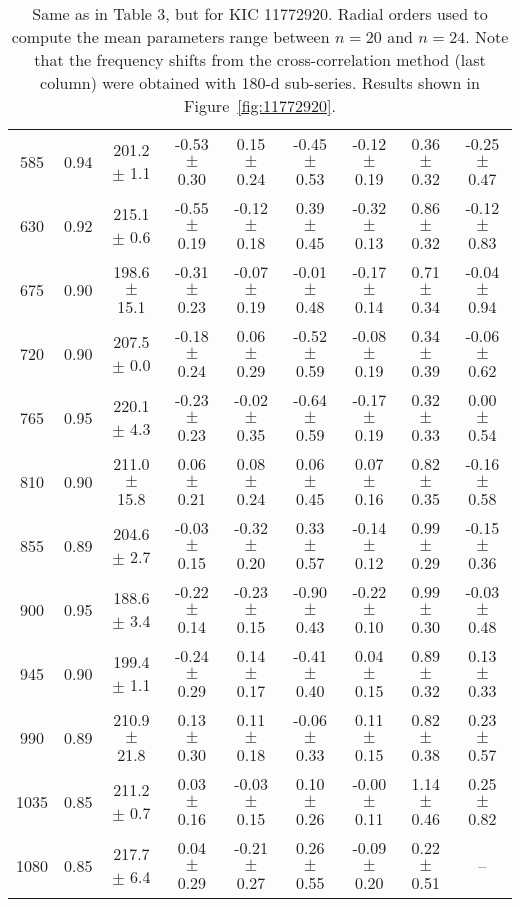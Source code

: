 \documentclass[twocolumn]{aastex61}%
\begin{document}
\begin{table*}[ht]
\begin{tabular}{ccc|ccccc|c}
585 & 0.94 & 201.2 $\pm$ 1.1 & -0.53 $\pm$ 0.30 & 0.15 $\pm$ 0.24 & -0.45 $\pm$ 0.53 & -0.12 $\pm$ 0.19 & 0.36 $\pm$ 0.32 & -0.25 $\pm$ 0.47\\
630 & 0.92 & 215.1 $\pm$ 0.6 & -0.55 $\pm$ 0.19 & -0.12 $\pm$ 0.18 & 0.39 $\pm$ 0.45 & -0.32 $\pm$ 0.13 & 0.86 $\pm$ 0.32 & -0.12 $\pm$ 0.83\\
675 & 0.90 & 198.6 $\pm$ 15.1 & -0.31 $\pm$ 0.23 & -0.07 $\pm$ 0.19 & -0.01 $\pm$ 0.48 & -0.17 $\pm$ 0.14 & 0.71 $\pm$ 0.34 & -0.04 $\pm$ 0.94\\
720 & 0.90 & 207.5 $\pm$ 0.0 & -0.18 $\pm$ 0.24 & 0.06 $\pm$ 0.29 & -0.52 $\pm$ 0.59 & -0.08 $\pm$ 0.19 & 0.34 $\pm$ 0.39 & -0.06 $\pm$ 0.62\\
765 & 0.95 & 220.1 $\pm$ 4.3 & -0.23 $\pm$ 0.23 & -0.02 $\pm$ 0.35 & -0.64 $\pm$ 0.59 & -0.17 $\pm$ 0.19 & 0.32 $\pm$ 0.33 & 0.00 $\pm$ 0.54\\
810 & 0.90 & 211.0 $\pm$ 15.8 & 0.06 $\pm$ 0.21 & 0.08 $\pm$ 0.24 & 0.06 $\pm$ 0.45 & 0.07 $\pm$ 0.16 & 0.82 $\pm$ 0.35 & -0.16 $\pm$ 0.58\\
855 & 0.89 & 204.6 $\pm$ 2.7 & -0.03 $\pm$ 0.15 & -0.32 $\pm$ 0.20 & 0.33 $\pm$ 0.57 & -0.14 $\pm$ 0.12 & 0.99 $\pm$ 0.29 & -0.15 $\pm$ 0.36\\
900 & 0.95 & 188.6 $\pm$ 3.4 & -0.22 $\pm$ 0.14 & -0.23 $\pm$ 0.15 & -0.90 $\pm$ 0.43 & -0.22 $\pm$ 0.10 & 0.99 $\pm$ 0.30 & -0.03 $\pm$ 0.48\\
945 & 0.90 & 199.4 $\pm$ 1.1 & -0.24 $\pm$ 0.29 & 0.14 $\pm$ 0.17 & -0.41 $\pm$ 0.40 & 0.04 $\pm$ 0.15 & 0.89 $\pm$ 0.32 & 0.13 $\pm$ 0.33\\
990 & 0.89 & 210.9 $\pm$ 21.8 & 0.13 $\pm$ 0.30 & 0.11 $\pm$ 0.18 & -0.06 $\pm$ 0.33 & 0.11 $\pm$ 0.15 & 0.82 $\pm$ 0.38 & 0.23 $\pm$ 0.57\\
1035 & 0.85 & 211.2 $\pm$ 0.7 & 0.03 $\pm$ 0.16 & -0.03 $\pm$ 0.15 & 0.10 $\pm$ 0.26 & -0.00 $\pm$ 0.11 & 1.14 $\pm$ 0.46 & 0.25 $\pm$ 0.82\\
1080 & 0.85 & 217.7 $\pm$ 6.4 & 0.04 $\pm$ 0.29 & -0.21 $\pm$ 0.27 & 0.26 $\pm$ 0.55 & -0.09 $\pm$ 0.20 & 0.22 $\pm$ 0.51 & --\\
\end{tabular}
\caption{Same as in Table 3, but for KIC 11772920. {Radial orders used to compute the mean parameters range between $n=20$ and $n=24$.} Note that the frequency shifts from the cross-correlation method (last column) were obtained with 180-d sub-series. Results shown in Figure~\ref{fig:11772920}.}\label{tab:11772920}
\end{table*}
\end{document}
